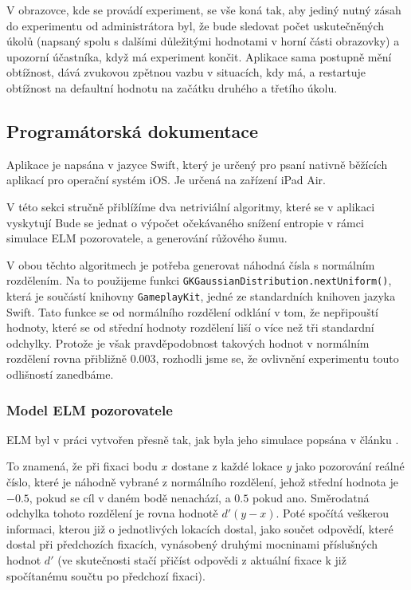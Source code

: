 \bigskip
V obrazovce, kde se provádí experiment, se vše koná tak, aby jediný nutný zásah
do experimentu od administrátora byl, že bude sledovat počet uskutečněných
úkolů (napsaný spolu s dalšími důležitými hodnotami v horní části obrazovky) a
upozorní účastníka, když má experiment končit. Aplikace sama postupně mění
obtížnost, dává zvukovou zpětnou vazbu v situacích, kdy má, a restartuje
obtížnost na defaultní hodnotu na začátku druhého a třetího úkolu.

\subsection*{Programátorská dokumentace}

Aplikace je napsána v jazyce Swift, který je určený pro psaní nativně běžících
aplikací pro operační systém iOS. Je určená na zařízení iPad Air.

V této sekci stručně přiblížíme dva netriviální algoritmy, které se v aplikaci
vyskytují Bude se jednat o výpočet očekávaného snížení entropie v rámci
simulace ELM pozorovatele, a generování růžového šumu.

V obou těchto algoritmech je potřeba generovat náhodná čísla s normálním
rozdělením. Na to použijeme funkci {\tt GKGaussianDistribution.nextUniform()},
která je součástí knihovny {\tt GameplayKit}, jedné ze standardních knihoven
jazyka Swift. Tato funkce se od normálního rozdělení odklání v tom, že
nepřipouští hodnoty, které se od střední hodnoty rozdělení liší o více než tři
standardní odchylky. Protože je však pravděpodobnost takových hodnot v
normálním rozdělení rovna přibližně $0.003$, rozhodli jsme se, že ovlivnění
experimentu touto odlišností zanedbáme.

\subsubsection*{Model ELM pozorovatele}

ELM  byl v práci vytvořen přesně tak, jak byla jeho simulace popsána v článku \citep{Najemnik09}. 

To znamená, že při fixaci bodu $x$  dostane z každé lokace $y$ jako pozorování reálné
číslo, které je náhodně vybrané z normálního rozdělení, jehož střední hodnota
je $-0.5$, pokud se cíl v daném bodě nenachází, a $0.5$ pokud ano. Směrodatná
odchylka tohoto rozdělení je rovna hodnotě $d'(y-x)$. Poté
spočítá veškerou informaci, kterou již o jednotlivých lokacích dostal, jako
součet odpovědí, které dostal při předchozích fixacích, vynásobený druhými
mocninami příslušných hodnot $d'$ (ve skutečnosti stačí přičíst odpovědi z
aktuální fixace k již spočítanému součtu po předchozí fixaci).

